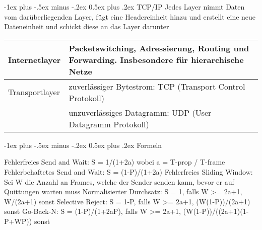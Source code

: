 \documentclass[10pt,landscape]{article}
\makeatletter
\renewcommand{\section}{\@startsection{section}{1}{0mm}%
                                {-1ex plus -.5ex minus -.2ex}%
                                {0.5ex plus .2ex}%
                                {\normalfont\large\bfseries}}
\makeatother
\begin{document}
\begin{tabular}{l | l | l}
\end{tabular}

\section{TCP/IP}
Jedes Layer nimmt Daten vom darüberliegenden Layer, fügt eine Headereinheit hinzu und erstellt eine neue Dateneinheit und schickt diese an das Layer darunter
\begin{tabular}{l | l}
    Internetlayer & Packetswitching, Adressierung, Routing und Forwarding. Insbesondere für hierarchische Netze \\
    \hline
    Transportlayer & zuverlässiger Bytestrom: TCP (Transport Control Protokoll) \\
        & unzuverlässiges Datagramm: UDP (User Datagramm Protokoll)\\
\end{tabular}


\section{Formeln}

Fehlerfreies Send and Wait: S = 1/(1+2a) wobei a = T-prop / T-frame
Fehlerbehaftetes Send and Wait: S = (1-P)/(1+2a)
Fehlerfreies Sliding Window: Sei W die Anzahl an Frames, welche der Sender senden kann, bevor er auf Quittungen warten muss
Normalisierter Durchsatz: S = {1, falls W >= 2a+1, W/(2a+1) sonst}
Selective Reject: S = {1-P, falls W >= 2a+1, (W(1-P))/(2a+1) sonst}
Go-Back-N: S = {(1-P)/(1+2aP), falls W >= 2a+1, (W(1-P))/((2a+1)(1-P+WP)) sonst}
\end{document}
